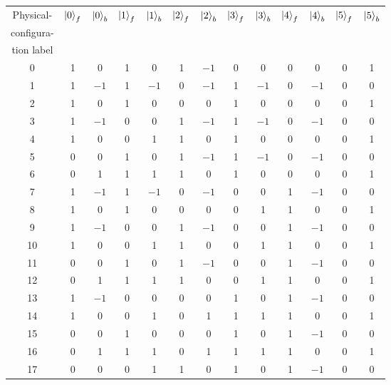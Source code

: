 \documentclass[a4paper,onecolumn,11pt,accepted=2024-10-11]{quantumarticle}
\begin{document}
\begin{table}[ht!]
    \centering
    \begin{tabular}{|c||*{12}{c|}}\hline
Physical- & \multirow{3}{*}{$\ket{0}_{f}$} & \multirow{3}{*}{$\ket{0}_{b}$} & \multirow{3}{*}{$\ket{1}_{f}$} & \multirow{3}{*}{$\ket{1}_{b}$} & \multirow{3}{*}{$\ket{2}_{f}$} & \multirow{3}{*}{$\ket{2}_{b}$} & \multirow{3}{*}{$\ket{3}_{f}$} & \multirow{3}{*}{$\ket{3}_{b}$} & \multirow{3}{*}{$\ket{4}_{f}$} & \multirow{3}{*}{$\ket{4}_{b}$} & \multirow{3}{*}{$\ket{5}_{f}$} & \multirow{3}{*}{$\ket{5}_{b}$} \\
configura- & & & & & & & & & & & & \\
tion label & & & & & & & & & & & & \\
\hline
0 & 1 & 0 & 1 & 0 & 1 & $-1$ & 0 & 0 & 0 & 0 & 0 & 1 \\ \hline
1 & 1 & $-1$ & 1 & $-1$ & 0 & $-1$ & 1 & $-1$ & 0 & $-1$ & 0 & 0 \\ \hline
2 & 1 & 0 & 1 & 0 & 0 & 0 & 1 & 0 & 0 & 0 & 0 & 1 \\ \hline
3 & 1 & $-1$ & 0 & 0 & 1 & $-1$ & 1 & $-1$ & 0 & $-1$ & 0 & 0 \\ \hline
4 & 1 & 0 & 0 & 1 & 1 & 0 & 1 & 0 & 0 & 0 & 0 & 1 \\ \hline
5 & 0 & 0 & 1 & 0 & 1 & $-1$ & 1 & $-1$ & 0 & $-1$ & 0 & 0 \\ \hline
6 & 0 & 1 & 1 & 1 & 1 & 0 & 1 & 0 & 0 & 0 & 0 & 1 \\ \hline
7 & 1 & $-1$ & 1 & $-1$ & 0 & $-1$ & 0 & 0 & 1 & $-1$ & 0 & 0 \\ \hline
8 & 1 & 0 & 1 & 0 & 0 & 0 & 0 & 1 & 1 & 0 & 0 & 1 \\ \hline
9 & 1 & $-1$ & 0 & 0 & 1 & $-1$ & 0 & 0 & 1 & $-1$ & 0 & 0 \\ \hline
10 & 1 & 0 & 0 & 1 & 1 & 0 & 0 & 1 & 1 & 0 & 0 & 1 \\ \hline
11 & 0 & 0 & 1 & 0 & 1 & $-1$ & 0 & 0 & 1 & $-1$ & 0 & 0 \\ \hline
12 & 0 & 1 & 1 & 1 & 1 & 0 & 0 & 1 & 1 & 0 & 0 & 1 \\ \hline
13 & 1 & $-1$ & 0 & 0 & 0 & 0 & 1 & 0 & 1 & $-1$ & 0 & 0 \\ \hline
14 & 1 & 0 & 0 & 1 & 0 & 1 & 1 & 1 & 1 & 0 & 0 & 1 \\ \hline
15 & 0 & 0 & 1 & 0 & 0 & 0 & 1 & 0 & 1 & $-1$ & 0 & 0 \\ \hline
16 & 0 & 1 & 1 & 1 & 0 & 1 & 1 & 1 & 1 & 0 & 0 & 1 \\ \hline
17 & 0 & 0 & 0 & 1 & 1 & 0 & 1 & 0 & 1 & $-1$ & 0 & 0 \\ \hline

\end{tabular}
\end{table}
\end{document}
